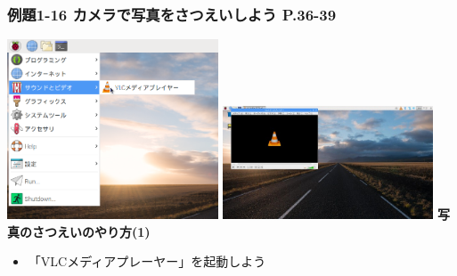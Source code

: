 \documentclass[dvipdfmx]{beamer}
\begin{document}
\begin{frame}[fragile]
	\frametitle{例題1-16 カメラで写真をさつえいしよう P.36-39~~~}
    \includegraphics[width=0.47\textwidth]{textbook-img113.png}
    \hfill
    \includegraphics[width=0.47\textwidth]{textbook-img114.jpg}
    \vfill
    \large\textbf{写真のさつえいのやり方(1)}
    \begin{itemize}
      \item 「VLCメディアプレーヤー」を起動しよう
    \end{itemize}
\end{frame}
\end{document}
